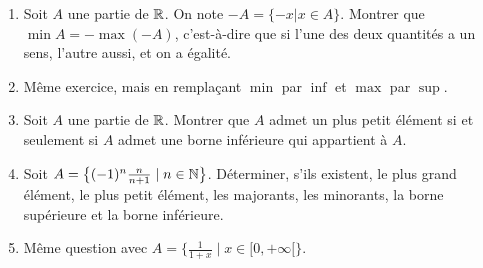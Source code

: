 \begin{frame}
\begin{miniexercice}
\begin{enumerate}
  \item Soit $A$ une partie de $\mathbb{R}$. On note $-A=\{-x| x\in A\}$. Montrer que $\min A=-\max(-A)$,
c'est-à-dire que si l'une des deux quantités a un sens, l'autre aussi, et on a égalité.
  \item Même exercice, mais en remplaçant $\min$ par $\inf$ et $\max$ par $\sup$.
  \item Soit $A$ une partie de $\mathbb{R}$. Montrer que $A$ admet un plus petit
élément si et seulement si $A$ admet une borne inférieure qui appartient à $A$.
  \item Soit $A=\big\{(-1)^n \frac{n}{n+1}\mid n\in \mathbb{N}\big\}$. Déterminer, s'ils existent, le plus grand élément, le plus petit élément,
les majorants, les minorants, la borne supérieure et la borne inférieure.
  \item Même question avec $A= \big\{ \frac{1}{1+x} \mid x \in [0,+\infty[ \big\}$.
  \end{enumerate}
\end{miniexercice}
\end{frame}



